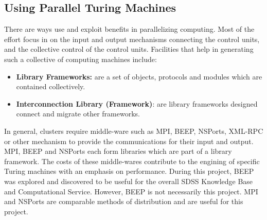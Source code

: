 \documentclass[11pt]{article}
\begin{document}
\newpage
\begin{Large}
\section {Using Parallel Turing Machines}
There are ways use and exploit benefits in parallelizing computing.  Most of the effort focus in on the input and output mechanisms connecting the control units, and the collective control of the control units.  Facilities that help in generating such a collective of computing machines include: 
\begin{itemize}
\item \textbf{Library Frameworks: } are a set of objects, protocols and modules which are contained collectively.  
\item \textbf{Interconnection Library (Framework)}: are library frameworks designed connect and migrate other frameworks.  
\end{itemize}

In general, clusters require middle-ware such as MPI, BEEP, NSPorts, XML-RPC or other mechanism to provide the communications for their input and output.   MPI, BEEP and NSPorts each form libraries which are part of a library framework.  %
The costs of these middle-wares contribute to the engining of specific Turing machines with an emphasis on performance.  %
During this project, BEEP was explored and discovered to be useful for the overall SDSS Knowledge Base and Computational Service.  However, BEEP is not necessarily this project.   MPI and NSPorts are comparable methods of distribution and are useful for this project.
\end{Large}
\end{document}
